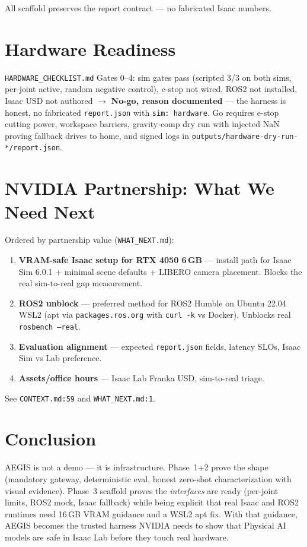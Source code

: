 \documentclass[11pt,a4paper]{article}
\begin{document}
All scaffold preserves the report contract — no fabricated Isaac numbers.

\section{Hardware Readiness}
\texttt{HARDWARE\_CHECKLIST.md} Gates 0--4: sim gates pass (scripted 3/3 on both sims, per-joint active, random negative control), e-stop not wired, ROS2 not installed, Isaac USD not authored $\rightarrow$ \textbf{No-go, reason documented} — the harness is honest, no fabricated \texttt{report.json} with \texttt{sim: hardware}. Go requires e-stop cutting power, workspace barriers, gravity-comp dry run with injected NaN proving fallback drives to home, and signed logs in \texttt{outputs/hardware-dry-run-*/report.json}.

\section{NVIDIA Partnership: What We Need Next}
Ordered by partnership value (\texttt{WHAT\_NEXT.md}):

\begin{enumerate}[leftmargin=18pt]
\item \textbf{VRAM-safe Isaac setup for RTX 4050 6\,GB} — install path for Isaac Sim 6.0.1 + minimal scene defaults + LIBERO camera placement. Blocks the real sim-to-real gap measurement.
\item \textbf{ROS2 unblock} — preferred method for ROS2 Humble on Ubuntu 22.04 WSL2 (apt via \texttt{packages.ros.org} with \texttt{curl -k} vs Docker). Unblocks real \texttt{rosbench --real}.
\item \textbf{Evaluation alignment} — expected \texttt{report.json} fields, latency SLOs, Isaac Sim vs Lab preference.
\item \textbf{Assets/office hours} — Isaac Lab Franka USD, sim-to-real triage.
\end{enumerate}

See \texttt{CONTEXT.md:59} and \texttt{WHAT\_NEXT.md:1}.

\section{Conclusion}
AEGIS is not a demo — it is infrastructure. Phase~1+2 prove the shape (mandatory gateway, deterministic eval, honest zero-shot characterization with visual evidence). Phase~3 scaffold proves the \textit{interfaces} are ready (per-joint limits, ROS2 mock, Isaac fallback) while being explicit that real Isaac and ROS2 runtimes need 16\,GB VRAM guidance and a WSL2 apt fix. With that guidance, AEGIS becomes the trusted harness NVIDIA needs to show that Physical AI models are safe in Isaac Lab before they touch real hardware.
\end{document}
